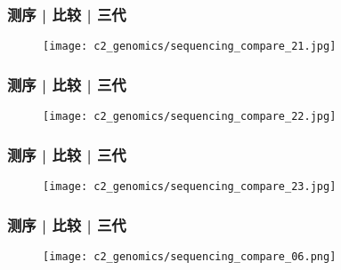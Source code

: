 \begin{frame}
  \frametitle{测序 | 比较 | 三代}
  \begin{figure}
    \centering
    \texttt{[image: c2\_genomics/sequencing\_compare\_21.jpg]}
  \end{figure}
\end{frame}

\begin{frame}
  \frametitle{测序 | 比较 | 三代}
  \begin{figure}
    \centering
    \texttt{[image: c2\_genomics/sequencing\_compare\_22.jpg]}
  \end{figure}
\end{frame}

\begin{frame}
  \frametitle{测序 | 比较 | 三代}
  \begin{figure}
    \centering
    \texttt{[image: c2\_genomics/sequencing\_compare\_23.jpg]}
  \end{figure}
\end{frame}

\begin{frame}
  \frametitle{测序 | 比较 | 三代}
  \begin{figure}
    \centering
    \texttt{[image: c2\_genomics/sequencing\_compare\_06.png]}
  \end{figure}
\end{frame}


